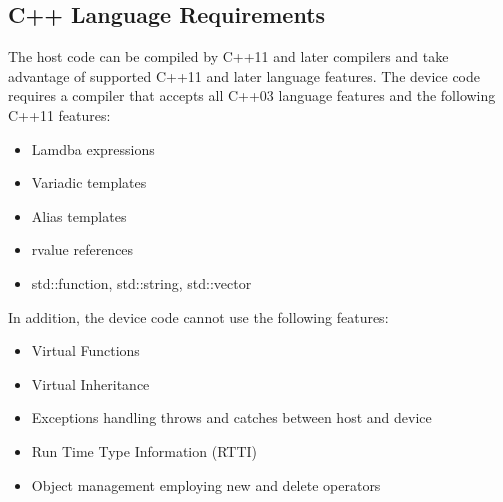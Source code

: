 \documentclass[letterpaper,10pt,english]{sphinxmanual}
\begin{document}
\subsection{C++ Language Requirements}
\label{\detokenize{programming-model/cpp-language-requirements:c-language-requirements}}\label{\detokenize{programming-model/cpp-language-requirements:cpp-language-requirements}}\label{\detokenize{programming-model/cpp-language-requirements::doc}}
The host code can be compiled by C++11 and later compilers and take
advantage of supported C++11 and later language features. The device
code requires a compiler that accepts all C++03 language features and
the following C++11 features:
\begin{itemize}
\item {} 
Lamdba expressions

\item {} 
Variadic templates

\item {} 
Alias templates

\item {} 
rvalue references

\item {} 
std::function, std::string, std::vector

\end{itemize}

In addition, the device code cannot use the following features:
\begin{itemize}
\item {} 
Virtual Functions

\item {} 
Virtual Inheritance

\item {} 
Exceptions handling \textendash{} throws and catches between host and device

\item {} 
Run Time Type Information (RTTI)

\item {} 
Object management employing new and delete operators

\end{itemize}
\end{document}
